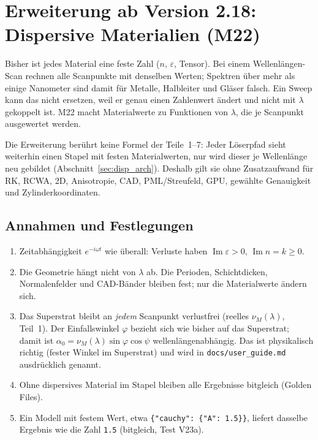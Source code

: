 \clearpage
\section{Erweiterung ab Version 2.18: Dispersive Materialien (M22)}\label{sec:disp}
Bisher ist jedes Material eine feste Zahl ($n$, $\varepsilon$, Tensor). Bei einem Wellenlängen-Scan rechnen alle
Scanpunkte mit denselben Werten; Spektren über mehr als einige Nanometer sind damit für Metalle, Halbleiter und
Gläser falsch. Ein Sweep kann das nicht ersetzen, weil er genau einen Zahlenwert ändert und nicht mit $\lambda$
gekoppelt ist. M22 macht Materialwerte zu Funktionen von $\lambda$, die je Scanpunkt ausgewertet werden.

Die Erweiterung berührt keine Formel der Teile~1--7: Jeder Löserpfad sieht weiterhin einen Stapel mit festen
Materialwerten, nur wird dieser je Wellenlänge neu gebildet (Abschnitt~\ref{sec:disp_arch}). Deshalb gilt sie
ohne Zusatzaufwand für RK, RCWA, 2D, Anisotropie, CAD, PML/Streufeld, GPU, gewählte Genauigkeit und
Zylinderkoordinaten.

\subsection{Annahmen und Festlegungen}
\begin{enumerate}[nosep]
  \item Zeitabhängigkeit $e^{-i\omega t}$ wie überall: Verluste haben $\operatorname{Im}\varepsilon>0$,
        $\operatorname{Im}n=k\ge 0$.
  \item Die Geometrie hängt nicht von $\lambda$ ab. Die Perioden, Schichtdicken, Normalenfelder und CAD-Bänder
        bleiben fest; nur die Materialwerte ändern sich.
  \item Das Superstrat bleibt an \emph{jedem} Scanpunkt verlustfrei (reelles $\nu_M(\lambda)$, Teil~1). Der
        Einfallswinkel $\varphi$ bezieht sich wie bisher auf das Superstrat; damit ist
        $\alpha_0=\nu_M(\lambda)\sin\varphi\cos\psi$ wellenlängenabhängig. Das ist physikalisch richtig (fester
        Winkel im Superstrat) und wird in \verb|docs/user_guide.md| ausdrücklich genannt.
  \item Ohne dispersives Material im Stapel bleiben alle Ergebnisse bitgleich (Golden Files).
  \item Ein Modell mit festem Wert, etwa \verb|{"cauchy": {"A": 1.5}}|, liefert dasselbe Ergebnis wie die Zahl
        \verb|1.5| (bitgleich, Test V23a).
\end{enumerate}

